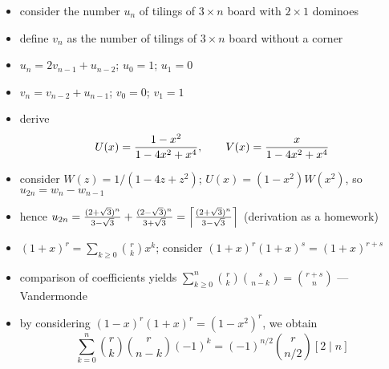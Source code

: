 \documentclass[10pt, a4paper]{article}
\newcommand*\ruleline[1]{\par\noindent\raisebox{.8ex}{\makebox[\linewidth]{\hrulefill\hspace{1ex}\raisebox{-.8ex}{#1}\hspace{1ex}\hrulefill}}}
\begin{document}
\begin{itemize}
    \item consider the number $u_n$ of tilings of $3\times n$ board with $2\times 1$ dominoes
    \item define $v_n$ as the number of tilings of $3\times n$ board without a corner
    \item $u_n = 2v_{n-1} + u_{n-2}$; \quad $u_0 = 1$; $u_1 = 0$
    \item $v_n = v_{n-2} + u_{n-1}$; \quad $v_0 = 0$; $v_1 = 1$
    \item derive $$U(x) = {1-x^2\over 1-4x^2+x^4},\qquad V(x) = {x\over 1-4x^2+x^4}$$
    \item consider $W(z) = 1/(1-4z+z^2)$; $U(x) = (1-x^2)W(x^2)$, so $u_{2n} = w_n - w_{n-1}$

    \item hence $u_{2n} = {(2+\sqrt 3)^n\over 3-\sqrt 3} + {(2-\sqrt 3)^n\over 3+\sqrt 3} = \left\lceil {(2+\sqrt 3)^n\over 3-\sqrt 3}\right\rceil$
            (derivation as a homework)
\end{itemize}


\ruleline{Discovering combinatorial identities via gfs [Knuth 198, Vandermonde and 5.55]}
\begin{itemize}
    \item $(1+x)^r = \sum_{k\ge 0} {r\choose k}x^k$; consider $(1+x)^r(1+x)^s = (1+x)^{r+s}$
    \item comparison of coefficients yields $\sum_{k\ge 0}^n {r\choose k}{s\choose n-k}={r+s\choose n}$ --- Vandermonde
    \item by considering $(1-x)^r(1+x)^r = (1-x^2)^r$, we obtain $$\sum_{k=0}^n {r\choose k}{r\choose n-k}(-1)^k = (-1)^{n/2}{r\choose n/2}[2\mid n]$$
\end{itemize}
\end{document}
